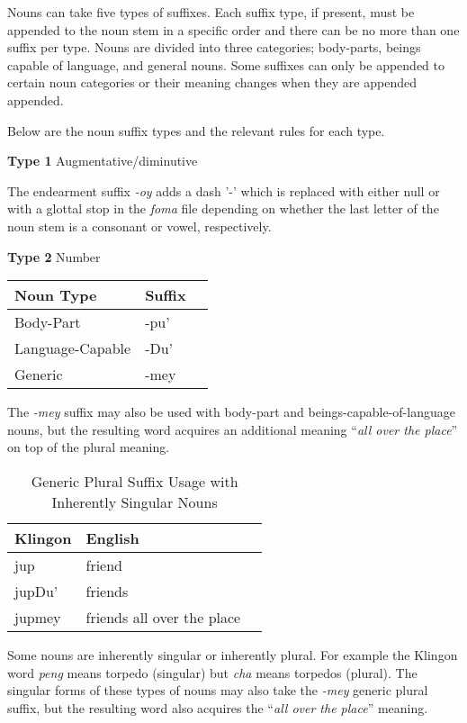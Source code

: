 \documentclass[11pt]{article}
\begin{document}
Nouns can take five types of suffixes. Each suffix type, if present, must be appended to the noun stem in a specific order and there can be no more than one suffix per type. Nouns are divided into three categories; body-parts, beings capable of language, and general nouns. Some suffixes can only be appended to certain noun categories or their meaning changes when they are appended appended.

Below are the noun suffix types and the relevant rules for each type.

\textbf{Type 1} Augmentative/diminutive

The endearment suffix \textit{-oy} adds a dash '-' which is replaced with either null or with a glottal stop in the \textit{foma} file depending on whether the last letter of the noun stem is a consonant or vowel, respectively.

\textbf{Type 2} Number

	\begin{center}
	\begin{tabular}{lll}
	\toprule
	\bf{Noun Type} & \bf{Suffix} \\
	\midrule
	Body-Part & -pu' \\
	Language-Capable & -Du' \\
	Generic & -mey \\
	\bottomrule
	\end{tabular}
	\end{center}

The \textit{-mey} suffix may also be used with body-part and beings-capable-of-language nouns, but the resulting word acquires an additional meaning ``\textit{all over the place}'' on top of the plural meaning.
	
	\begin{table}[h]
	\begin{center}
	\begin{tabular}{lll}
	\toprule
	\bf Klingon & \bf English \\
	\midrule
	jup & friend \\
	jupDu' & friends \\
	jupmey & friends all over the place \\
	\bottomrule
	\end{tabular}
	\end{center}
	\caption{Generic Plural Suffix Usage with Inherently Singular Nouns}
	\end{table}

Some nouns are inherently singular or inherently plural. For example the Klingon word \textit{peng} means torpedo (singular) but \textit{cha} means torpedos (plural). The singular forms of these types of nouns may also take the \textit{-mey} generic plural suffix, but the resulting word also acquires the ``\textit{all over the place}'' meaning.
	
\end{document}

